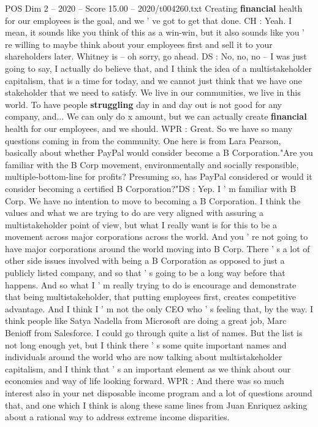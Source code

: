 \begin{textsample}{POS Dim 2 – 2020 – Score 15.00 – 2020/t004260.txt}
Creating \textbf{financial} health for our employees is the goal, and we ' ve got to get that done.
CH : Yeah.
I mean, it sounds like you think of this as a win-win, but it also sounds like you ' re willing to maybe think about your employees first and sell it to your shareholders later.
Whitney is -- oh sorry, go ahead.
DS : No, no, no -- I was just going to say, I actually do believe that, and I think the idea of a multistakeholder capitalism, that is a time for today, and we cannot just think that we have one stakeholder that we need to satisfy.
We live in our communities, we live in this world.
To have people \textbf{struggling} day in and day out is not good for any company, and...
We can only do x amount, but we can actually create \textbf{financial} health for our employees, and we should.
WPR : Great.
So we have so many questions coming in from the community.
One here is from Lara Pearson, basically about whether PayPal would consider become a B Corporation."Are you familiar with the B Corp movement, environmentally and socially responsible, multiple-bottom-line for profits?
Presuming so, has PayPal considered or would it consider becoming a certified B Corporation?"DS : Yep.
I ' m familiar with B Corp.
We have no intention to move to becoming a B Corporation.
I think the values and what we are trying to do are very aligned with assuring a multistakeholder point of view, but what I really want is for this to be a movement across major corporations across the world.
And you ' re not going to have major corporations around the world moving into B Corp.
There ' s a lot of other side issues involved with being a B Corporation as opposed to just a publicly listed company, and so that ' s going to be a long way before that happens.
And so what I ' m really trying to do is encourage and demonstrate that being multistakeholder, that putting employees first, creates competitive advantage.
And I think I ' m not the only CEO who ' s feeling that, by the way.
I think people like Satya Nadella from Microsoft are doing a great job, Marc Benioff from Salesforce.
I could go through quite a list of names.
But the list is not long enough yet, but I think there ' s some quite important names and individuals around the world who are now talking about multistakeholder capitalism, and I think that ' s an important element as we think about our economies and way of life looking forward.
WPR : And there was so much interest also in your net disposable income program and a lot of questions around that, and one which I think is along these same lines from Juan Enriquez asking about a rational way to address extreme income disparities.

\end{textsample}
